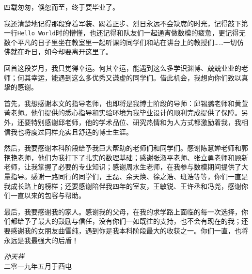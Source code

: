 
\begin{acknowledgments}

四载匆匆，倏忽而至，终于要毕业了。

我还清楚地记得那段穿着军装、踢着正步、烈日永远不会缺席的时光，记得敲下第一行\texttt{Hello World}时的懵懂，也还记得和队友们一起通宵做数模的疲惫，更记得无数个平凡的日子里坐在教室里一起听课的同学们和站在讲台上的教授们……一切仿佛就在昨日，如今却要离开这里了。

回首这段岁月，我只觉得幸运。何其幸运，能遇到这么多学识渊博、兢兢业业的老师；何其幸运，能遇到这么多优秀又谦虚的同学们。借此机会，我想向你们致以真挚的感谢。

首先，我想感谢本文的指导老师，也即将是我博士阶段的导师：邱锡鹏老师和黄萱菁老师。他们提供的悉心指导和实验环境为我毕业设计的顺利完成提供了保障。另外，还要特别感谢邱老师，他的学术品位、研究热情和为人方式都激励着我，我相信我也将度过同样充实且舒适的博士生涯。

然后，我要感谢本科阶段给予我巨大帮助的老师们和同学们。感谢陈慧婵老师和郭艳艳老师，他们为我打下了扎实的数理基础；感谢张淑平老师、张立勇老师和顾新老师，让我掌握了必要的专业知识；感谢周水生老师，在我参与数模期间提供了大量指导。感谢一路同行的同学们，王磊、余天焕、徐之浩、班浩等等，你们一直是我成长路上的榜样；还要感谢陪伴我四年的室友，王敏锐、王许丞和冯尧，感谢你们一直以来的包容与帮助。

最后，我要感谢我的家人。感谢我的父母，在我的求学路上面临的每一次选择，你们都给予了最大的鼓励与信任，没有你们一如既往的支持，也不会有现在的我；还要感谢我的女朋友曲雪纯，遇到你是我本科阶段最大的收获之一。你们一直，也将永远是我最强大的后盾！

\begin{flushright}
	\emph{孙天祥}\\
	二零一九年五月于西电
\end{flushright}

\end{acknowledgments}

